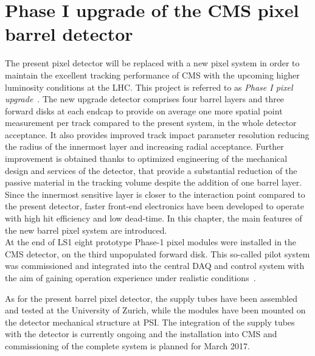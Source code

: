 \chapter{Phase I upgrade of the CMS pixel barrel detector}
\label{ch:Phase1Intro}

The present pixel detector will be replaced with a new pixel system in order to maintain the excellent tracking performance of CMS with the upcoming higher luminosity conditions at the LHC.
This project is referred to as \textit{Phase I pixel upgrade}~\cite{Dominguez:1481838}. The new upgrade detector comprises four barrel layers and three forward disks at each endcap to provide on average one more spatial point measurement per track compared to the present system, in the whole detector acceptance. It also provides improved track impact parameter resolution reducing the radius of the innermost layer and increasing radial acceptance. 
Further improvement is obtained thanks to optimized engineering of the mechanical design and services of the detector, that provide a substantial reduction of the passive material in the tracking volume despite the addition of one barrel layer. Since the innermost sensitive layer is closer to the interaction point compared to the present detector, faster front-end electronics have been developed to operate with high hit efficiency and low dead-time.
In this chapter, the main features of the new barrel pixel system are introduced.\\

At the end of LS1 eight prototype Phase-1 pixel modules were installed in the CMS detector, on the third unpopulated forward disk. This so-called pilot system was commissioned and integrated into the central DAQ and control system with the aim of gaining operation experience under realistic conditions~\cite{Akgun:2015afw}.

As for the present barrel pixel detector, the supply tubes have been assembled and tested at the University of Zurich, while the modules have been mounted on the detector mechanical structure at PSI. The integration of the supply tubes with the detector is currently ongoing and the installation into CMS and commissioning of the complete system is planned for March 2017.

